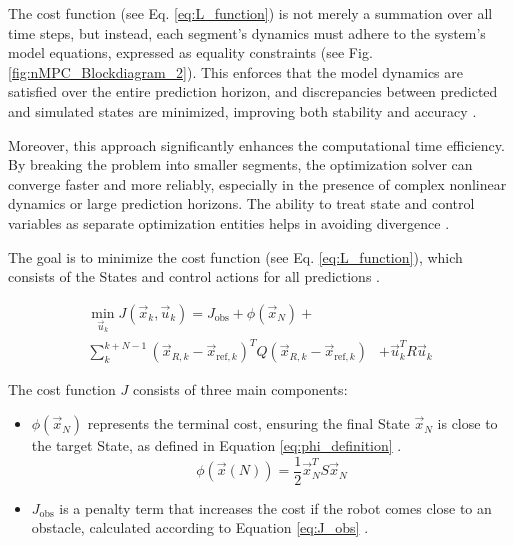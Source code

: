 \documentclass[conference]{IEEEtran}
\begin{document}
The cost function (see Eq. \ref{eq:L_function}) is not merely a summation over all time steps, but instead, each segment's dynamics must adhere to the system's model equations, expressed as equality constraints (see Fig. \ref{fig:nMPC_Blockdiagram_2}). This enforces that the model dynamics are satisfied over the entire prediction horizon, and discrepancies between predicted and simulated states are minimized, improving both stability and accuracy \cite{DIEHL2002577}.

Moreover, this approach significantly enhances the computational time efficiency. By breaking the problem into smaller segments, the optimization solver can converge faster and more reliably, especially in the presence of complex nonlinear dynamics or large prediction horizons. The ability to treat state and control variables as separate optimization entities helps in avoiding divergence \cite{BOCK19841603}.

The goal is to minimize the cost function (see Eq. \ref{eq:L_function}), which consists of the States and control actions for all predictions \cite{rawlings2009model}.

\begin{equation}
\label{eq:L_function}
\begin{aligned}
\min_{\vec{u}_k} J(\vec{x}_k, \vec{u}_k) = J_{\text{obs}} + \phi(\vec{x}_N) 
+ &\\ \sum_{k}^{k+N-1}
(\vec{x}_{R,k} - \vec{x}_{\text{ref},k})^T Q (\vec{x}_{R,k} - \vec{x}_{\text{ref},k})&+ \vec{u}_k^T R \vec{u}_k
\end{aligned}
\end{equation}

The cost function \(J\) consists of three main components:
\begin{itemize}
    \item \(\phi(\vec{x}_N)\) represents the terminal cost, ensuring the final State \(\vec{x}_N\) is close to the target State, as defined in Equation \ref{eq:phi_definition} \cite{rawlings2009model}.
    \begin{equation}
    \label{eq:phi_definition}
    \phi(\vec{x}(N)) = \frac{1}{2} \vec{x}_N^T S \vec{x}_N
    \end{equation}

    \item \(J_{\text{obs}}\) is a penalty term that increases the cost if the robot comes close to an obstacle, calculated according to Equation \ref{eq:J_obs} \cite{frasch2013parallel}.
\end{itemize}
\end{document}
